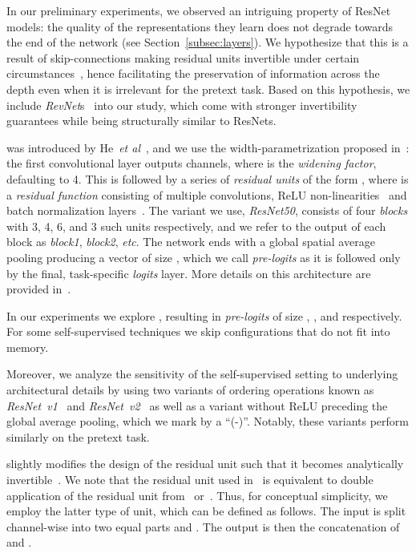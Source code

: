 \documentclass[10pt,twocolumn,letterpaper]{article}
\newcommand{\PAR}[1]{\vskip4pt \noindent {\bf #1~}}
\def\etc{\emph{etc}\onedot} \def\vs{\emph{vs}\onedot}
\def\etal{\emph{et al}\onedot}
\begin{document}
In our preliminary experiments, we observed an intriguing property of ResNet models:
the quality of the representations they learn does not degrade towards the end of the network (see Section~\ref{subsec:layers}).
We hypothesize that this is a result of skip-connections making residual units invertible under certain circumstances~\cite{behrmann2018invertible}, hence facilitating the preservation of information across the depth even when it is irrelevant for the pretext task.
Based on this hypothesis, we include \emph{RevNet}s~\cite{GomezNIPS17} into our study, which come with stronger invertibility guarantees while being structurally similar to ResNets.

\PAR{ResNet} was introduced by He~\etal~\cite{he2016deep}, and we use the width-parametrization proposed in~\cite{zagoruyko2016wide}:
the first  convolutional layer outputs  channels, where  is the \emph{widening factor}, defaulting to 4.
This is followed by a series of \emph{residual units} of the form , where  is a \emph{residual function} consisting of multiple convolutions, ReLU non-linearities~\cite{nair2010rectified} and batch normalization layers~\cite{ioffe2015batch}.
The variant we use, \emph{ResNet50}, consists of four \emph{blocks} with 3, 4, 6, and 3 such units respectively, and we refer to the output of each block as \emph{block1}, \emph{block2}, \etc.
The network ends with a global spatial average pooling producing a vector of size , which we call \emph{pre-logits} as it is followed only by the final, task-specific \emph{logits} layer.
More details on this architecture are provided in~\cite{he2016deep}.

In our experiments we explore , resulting in \emph{pre-logits} of size , ,  and  respectively.
For some self-supervised techniques we skip configurations that do not fit into memory.


Moreover, we analyze the sensitivity of the self-supervised setting to underlying architectural details by using two variants of ordering operations known as \emph{ResNet~v1}~\cite{he2016deep} and \emph{ResNet~v2}~\cite{he2016identity} as well as a variant without ReLU preceding the global average pooling, which we mark by a ``(-)''.
Notably, these variants perform similarly on the pretext task.


\PAR{RevNet} slightly modifies the design of the residual unit such that it becomes analytically invertible~\cite{GomezNIPS17}.
We note that the residual unit used in~\cite{GomezNIPS17} is equivalent to double application of the residual unit from~\cite{JacobsenICLR18} or~\cite{DinhICLR17}.
Thus, for conceptual simplicity, we employ the latter type of unit, which can be defined as follows.
The input  is split channel-wise into two equal parts  and .
The output  is then the concatenation of  and .
\end{document}
